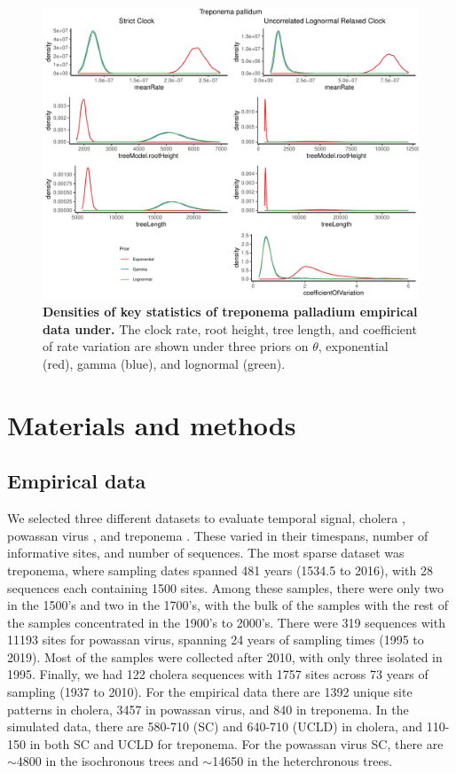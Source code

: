 \documentclass[10pt,letterpaper]{article}
\begin{document}
\begin{figure}[!h]
	\begin{center}
		\includegraphics[width=13cm]{sandbox_figures/treponema_density_plot.pdf}\newline
		\vspace{-0.5cm}
		\caption{\textbf{Densities of key statistics of treponema palladium empirical data under.} The clock rate, root height, tree length, and coefficient of rate variation are shown under three priors on $\theta$, exponential (red), gamma (blue), and lognormal (green).}
	\end{center}
\end{figure}


\section*{Materials and methods}
\subsection*{Empirical data}
We selected three different datasets to evaluate temporal signal, cholera \cite{devault2014second}, powassan virus \cite{vogels2023phylogeographic}, and treponema \cite{majander2020ancient}. These varied in their timespans, number of informative sites, and number of sequences. The most sparse dataset was treponema, where sampling dates spanned 481 years (1534.5 to 2016), with 28 sequences each containing 1500 sites. Among these samples, there were only two in the 1500's and two in the 1700's, with the bulk of the samples with the rest of the samples concentrated in the 1900's to 2000's. There were 319 sequences with 11193 sites for powassan virus, spanning 24 years of sampling times (1995 to 2019). Most of the samples were collected after 2010, with only three isolated in 1995. Finally, we had 122 cholera sequences with 1757 sites across 73 years of sampling (1937 to 2010). 
For the empirical data there are 1392 unique site patterns in cholera, 3457 in powassan virus, and 840 in treponema. In the simulated data, there are 580-710 (SC) and 640-710 (UCLD) in cholera, and 110-150 in both SC and UCLD for treponema. For the powassan virus SC, there are $\sim$4800 in the isochronous trees and $\sim$14650 in the heterchronous trees.
\end{document}
